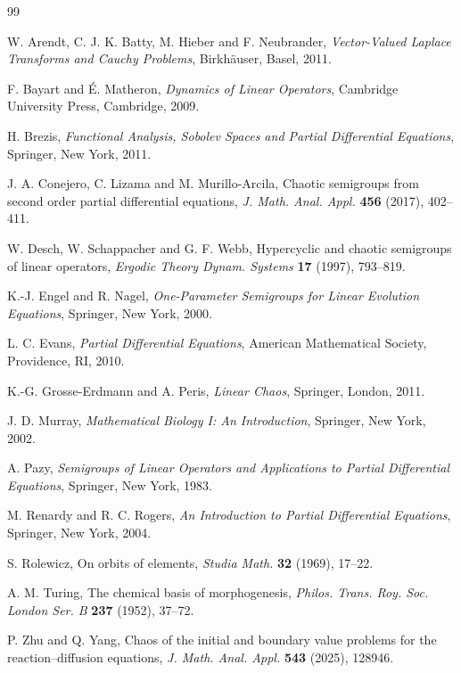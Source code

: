\documentclass[12pt]{article}
\begin{document}
\begin{thebibliography}{99}

W. Arendt, C. J. K. Batty, M. Hieber and F. Neubrander,
\emph{Vector-Valued Laplace Transforms and Cauchy Problems},
Birkh\"auser, Basel, 2011.

F. Bayart and \'E. Matheron,
\emph{Dynamics of Linear Operators},
Cambridge University Press, Cambridge, 2009.

H. Brezis,
\emph{Functional Analysis, Sobolev Spaces and Partial Differential Equations},
Springer, New York, 2011.

J. A. Conejero, C. Lizama and M. Murillo-Arcila,
Chaotic semigroups from second order partial differential equations,
\emph{J. Math. Anal. Appl.} \textbf{456} (2017), 402--411.

W. Desch, W. Schappacher and G. F. Webb,
Hypercyclic and chaotic semigroups of linear operators,
\emph{Ergodic Theory Dynam. Systems} \textbf{17} (1997), 793--819.

K.-J. Engel and R. Nagel,
\emph{One-Parameter Semigroups for Linear Evolution Equations},
Springer, New York, 2000.

L. C. Evans,
\emph{Partial Differential Equations},
American Mathematical Society, Providence, RI, 2010.

K.-G. Grosse-Erdmann and A. Peris,
\emph{Linear Chaos},
Springer, London, 2011.

J. D. Murray,
\emph{Mathematical Biology I: An Introduction},
Springer, New York, 2002.

A. Pazy,
\emph{Semigroups of Linear Operators and Applications to Partial Differential Equations},
Springer, New York, 1983.

M. Renardy and R. C. Rogers,
\emph{An Introduction to Partial Differential Equations},
Springer, New York, 2004.

S. Rolewicz,
On orbits of elements,
\emph{Studia Math.} \textbf{32} (1969), 17--22.

A. M. Turing,
The chemical basis of morphogenesis,
\emph{Philos. Trans. Roy. Soc. London Ser. B} \textbf{237} (1952), 37--72.

P. Zhu and Q. Yang,
Chaos of the initial and boundary value problems for the reaction--diffusion equations,
\emph{J. Math. Anal. Appl.} \textbf{543} (2025), 128946.

\end{thebibliography}
\end{document}
